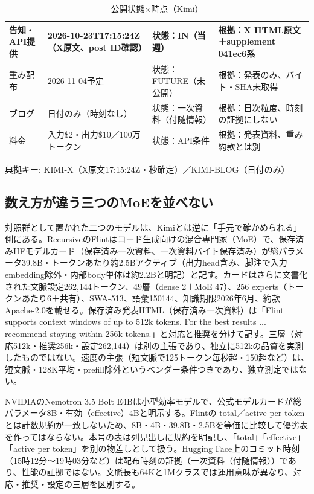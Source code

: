 \documentclass[lualatex,a4paper,10pt]{jlreq}
\begin{document}
\begin{table}[htbp]\centering\footnotesize
\caption{公開状態×時点（Kimi）}
\begin{tabularx}{0.96\linewidth}{@{}lXXX@{}}
\toprule
告知・API提供 & 2026-10-23T17:15:24Z（X原文、post ID確認） & 状態：IN（当週） & 根拠：X HTML原文＋supplement 041ec6系 \\
\midrule
重み配布 & 2026-11-04予定 & 状態：FUTURE（未公開） & 根拠：発表のみ、バイト・SHA未取得 \\
ブログ & 日付のみ（時刻なし） & 状態：一次資料（付随情報） & 根拠：日次粒度、時刻の証拠にしない \\
料金 & 入力\$2・出力\$10／100万トークン & 状態：API条件 & 根拠：発表資料、重み約款とは別 \\
\bottomrule
\end{tabularx}
{\scriptsize\color{SurveyMuted} 典拠キー: KIMI-X（X原文17:15:24Z・秒確定）／KIMI-BLOG（日付のみ）\par}
\end{table}


\subsection*{数え方が違う三つのMoEを並べない}


対照群として置かれた二つのモデルは、Kimiとは逆に「手元で確かめられる」側にある。RecursiveのFlintはコード生成向けの混合専門家（MoE）で、保存済みHFモデルカード（保存済み一次資料、一次資料バイト保存済み）が総パラメータ39.8B・トークンあたり約2.5Bアクティブ（出力head含み、脚注で入力embedding除外・内部body単体は約2.2Bと明記）と記す。カードはさらに文書化された文脈設定262,144トークン、49層（dense 2＋MoE 47）、256 experts（トークンあたり6＋共有）、SWA-513、語彙150144、知識期限2026年6月、約款Apache-2.0を載せる。保存済み発表HTML（保存済み一次資料）は「Flint supports context windows of up to 512k tokens. For the best results ... recommend staying within 256k tokens.」と対応と推奨を分けて記す。三層（対応512k・推奨256k・設定262,144）は別の主張であり、独立に512kの品質を実測したものではない。速度の主張（短文脈で125トークン毎秒超・150超など）は、短文脈・128K平均・prefill除外というベンダー条件つきであり、独立測定ではない。


NVIDIAのNemotron 3.5 Bolt E4Bは小型効率モデルで、公式モデルカードが総パラメータ8B・有効（effective）4Bと明示する。Flintの total／active per token とは計数規約が一致しないため、8B・4B・39.8B・2.5Bを等価に比較して優劣表を作ってはならない。本号の表は列見出しに規約を明記し、「total」「effective」「active per token」を別の物差しとして扱う。Hugging Face上のコミット時刻（15時12分～19時03分など）は配布時刻の証拠（一次資料（付随情報））であり、性能の証拠ではない。文脈長も64Kと1Mクラスでは運用意味が異なり、対応・推奨・設定の三層を区別する。
\end{document}
